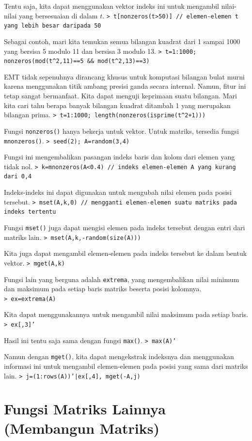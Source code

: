 \documentclass[11pt, a4paper]{article}
\newcommand{\emtcmd}[1]{\noindent\texttt{\textcolor{emtcommand}{>}\ #1}\par\smallskip}
\begin{document}
Tentu saja, kita dapat menggunakan vektor indeks ini untuk mengambil nilai-nilai yang bersesuaian di dalam $t$.
\emtcmd{t[nonzeros(t>50)] \textcolor{emtcomment}{// elemen-elemen t yang lebih besar daripada 50}}

Sebagai contoh, mari kita temukan semua bilangan kuadrat dari 1 sampai 1000 yang bersisa 5 modulo 11 dan bersisa 3 modulo 13.
\emtcmd{t=1:1000; nonzeros(mod(t\^{}2,11)==5 \&\& mod(t\^{}2,13)==3)}

EMT tidak sepenuhnya dirancang khusus untuk komputasi bilangan bulat murni karena menggunakan titik ambang presisi ganda secara internal. Namun, fitur ini tetap sangat bermanfaat. Kita dapat menguji keprimaan suatu bilangan. Mari kita cari tahu berapa banyak bilangan kuadrat ditambah 1 yang merupakan bilangan prima.
\emtcmd{t=1:1000; length(nonzeros(isprime(t\^{}2+1)))}

Fungsi \texttt{nonzeros()} hanya bekerja untuk vektor. Untuk matriks, tersedia fungsi \texttt{mnonzeros()}.
\emtcmd{seed(2); A=random(3,4)}

Fungsi ini mengembalikan pasangan indeks baris dan kolom dari elemen yang tidak nol.
\emtcmd{k=mnonzeros(A<0.4) \textcolor{emtcomment}{// indeks elemen-elemen A yang kurang dari 0,4}}

Indeks-indeks ini dapat digunakan untuk mengubah nilai elemen pada posisi tersebut.
\emtcmd{mset(A,k,0) \textcolor{emtcomment}{// mengganti elemen-elemen suatu matriks pada indeks tertentu}}

Fungsi \texttt{mset()} juga dapat mengisi elemen pada indeks tersebut dengan entri dari matriks lain.
\emtcmd{mset(A,k,-random(size(A)))}

Kita juga dapat mengambil elemen-elemen pada indeks tersebut ke dalam bentuk vektor.
\emtcmd{mget(A,k)}

Fungsi lain yang berguna adalah \texttt{extrema}, yang mengembalikan nilai minimum dan maksimum pada setiap baris matriks beserta posisi kolomnya.
\emtcmd{ex=extrema(A)}

Kita dapat menggunakannya untuk mengambil nilai maksimum pada setiap baris.
\emtcmd{ex[,3]'}

Hasil ini tentu saja sama dengan fungsi \texttt{max()}.
\emtcmd{max(A)'}

Namun dengan \texttt{mget()}, kita dapat mengekstrak indeksnya dan menggunakan informasi ini untuk mengambil elemen-elemen pada posisi yang sama dari matriks lain.
\emtcmd{j=(1:rows(A))'|ex[,4], mget(-A,j)}

\section*{Fungsi Matriks Lainnya (Membangun Matriks)}
\end{document}
